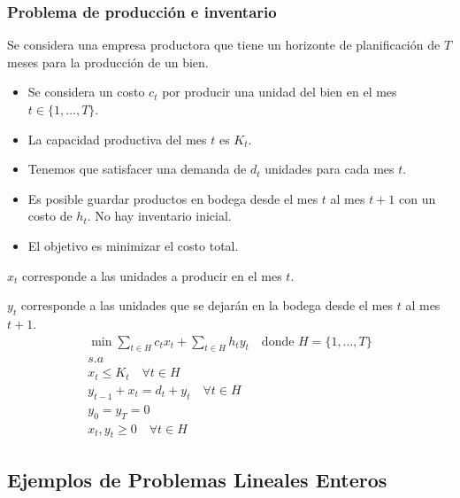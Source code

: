 \documentclass[../main.tex]{subfiles}
\begin{document}
\subsubsection{Problema de producción e inventario}
Se considera una empresa productora que tiene un horizonte de planificación de $T$ meses para la producción de un bien.\\
\begin{minipage}[t]{.45\textwidth}
  \begin{itemize}
    \item Se considera un costo $c_t$ por producir una unidad del bien en el mes $t \in \{ 1, \ldots, T \}$.
    \item La capacidad productiva del mes $t$ es $K_t$.
    \item Tenemos que satisfacer una demanda de $d_t$ unidades para cada mes $t$.
    \item Es posible guardar productos en bodega desde el mes $t$ al mes $t+1$ con un costo de $h_t$. No hay inventario inicial.
    \item El objetivo es minimizar el costo total.
  \end{itemize}
\end{minipage}
\hfill
\begin{minipage}[t]{.45\textwidth}
  $x_t$ corresponde a las unidades a producir en el mes $t$.

  $y_t$ corresponde a las unidades que se dejarán en la bodega desde el mes $t$ al mes $t+1$.
  \begin{gather*}
    \min \sum_{t \in H} c_t x_t + \sum_{t \in H} h_t y_t \quad \text{donde } H = \{ 1, \ldots, T \}\\
    s.a \\
    x_t \leq K_t \quad \forall t \in H \\
    y_{t-1} + x_t = d_t + y_t \quad \forall t \in H \\
    y_0 = y_T = 0 \\
    x_t, y_t \geq 0 \quad \forall t \in H
  \end{gather*}
\end{minipage}


\subsection{Ejemplos de Problemas Lineales Enteros}
\end{document}
